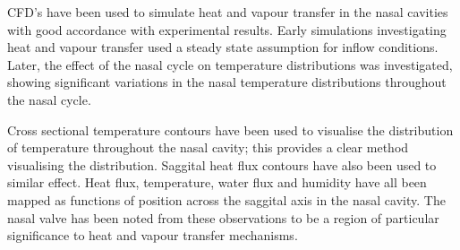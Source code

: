 CFD's have been used to simulate heat and vapour transfer in the nasal cavities with good accordance with experimental results\cite{Lindemann2004}. Early simulations investigating heat and vapour transfer used a steady state assumption for inflow conditions\cite{Naftali1998}. Later, the effect of the nasal cycle on temperature distributions was investigated, showing significant variations in the nasal temperature distributions throughout the nasal cycle\cite{Elad2006}.

Cross sectional temperature contours have been used to visualise the distribution of temperature throughout the nasal cavity; this provides a clear method visualising the distribution\cite{Naftali2005}. Saggital heat flux contours have also been used to similar effect\cite{Sullivan2013}. Heat flux, temperature, water flux and humidity have all been mapped as functions of position across the saggital axis in the nasal cavity\cite{Garcia2007, Sullivan2013, Yu2014}. The nasal valve has been noted from these observations to be a region of particular significance to heat and vapour transfer mechanisms\cite{Sullivan2013}. 




%
%
%
%
%
%
%
%
%
%
%
%
%
%
%
%
%
%



